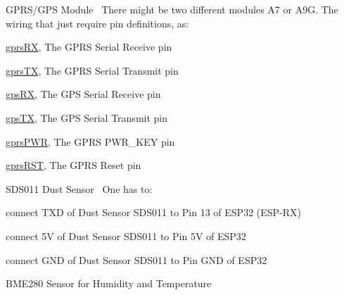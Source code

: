 \begin{DoxyEnumerate}
\item G\+P\+R\+S/\+G\+PS Module~\newline
 There might be two different modules A7 or A9G. The wiring that just require pin definitions, as\+:
\begin{DoxyItemize}
\item \mbox{\hyperlink{sensor_8h_ace67731836adaa94431a11f2f3afb49a}{gprs\+RX}}, The G\+P\+RS Serial Receive pin
\item \mbox{\hyperlink{sensor_8h_a5ab75e95ce2325b3ac18daff066d985d}{gprs\+TX}}, The G\+P\+RS Serial Transmit pin
\item \mbox{\hyperlink{sensor_8h_a54cd714ce172e08013354f7d6c56d135}{gps\+RX}}, The G\+PS Serial Receive pin
\item \mbox{\hyperlink{sensor_8h_ab42918d6ca01f71bd8dd82e1240c0fd5}{gps\+TX}}, The G\+PS Serial Transmit pin
\item \mbox{\hyperlink{sensor_8h_a1e69be52013b297b059ae19db0b250c0}{gprs\+P\+WR}}, The G\+P\+RS P\+W\+R\+\_\+\+K\+EY pin
\item \mbox{\hyperlink{sensor_8h_a2c31d1c293a323099296e12f60bdd606}{gprs\+R\+ST}}, The G\+P\+RS Reset pin
\end{DoxyItemize}
\item S\+D\+S011 Dust Sensor~\newline
 One has to\+:
\begin{DoxyItemize}
\item connect T\+XD of Dust Sensor S\+D\+S011 to Pin 13 of E\+S\+P32 (E\+S\+P-\/\+RX)
\item connect 5V of Dust Sensor S\+D\+S011 to Pin 5V of E\+S\+P32
\item connect G\+ND of Dust Sensor S\+D\+S011 to Pin G\+ND of E\+S\+P32
\end{DoxyItemize}
\item B\+M\+E280 Sensor for Humidity and Temperature~\newline


\end{DoxyEnumerate}
